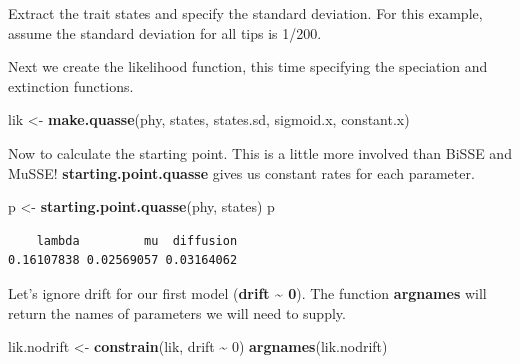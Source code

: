\documentclass[
]{book}
\newenvironment{Shaded}{\begin{snugshade}}{\end{snugshade}}
\newcommand{\DecValTok}[1]{\textcolor[rgb]{0.00,0.00,0.81}{#1}}
\newcommand{\KeywordTok}[1]{\textcolor[rgb]{0.13,0.29,0.53}{\textbf{#1}}}
\newcommand{\NormalTok}[1]{#1}
\newcommand{\OperatorTok}[1]{\textcolor[rgb]{0.81,0.36,0.00}{\textbf{#1}}}
\newcommand{\StringTok}[1]{\textcolor[rgb]{0.31,0.60,0.02}{#1}}
\begin{document}
Extract the trait states and specify the standard deviation. For this example, assume the standard deviation for all tips is 1/200.

\begin{Shaded}
\end{Shaded}

Next we create the likelihood function, this time specifying the speciation and extinction functions.

\begin{Shaded}
\begin{Highlighting}[]
\NormalTok{lik \textless{}{-}}\StringTok{ }\KeywordTok{make.quasse}\NormalTok{(phy, states, states.sd, sigmoid.x, constant.x)}
\end{Highlighting}
\end{Shaded}

Now to calculate the starting point. This is a little more involved than BiSSE and MuSSE! \textbf{starting.point.quasse} gives us constant rates for each parameter.

\begin{Shaded}
\begin{Highlighting}[]
\NormalTok{p \textless{}{-}}\StringTok{ }\KeywordTok{starting.point.quasse}\NormalTok{(phy, states)}
\NormalTok{p}
\end{Highlighting}
\end{Shaded}

\begin{verbatim}
    lambda         mu  diffusion 
0.16107838 0.02569057 0.03164062 
\end{verbatim}

Let's ignore drift for our first model (\textbf{drift \textasciitilde{} 0}). The function \textbf{argnames} will return the names of parameters we will need to supply.

\begin{Shaded}
\begin{Highlighting}[]
\NormalTok{lik.nodrift \textless{}{-}}\StringTok{ }\KeywordTok{constrain}\NormalTok{(lik, drift }\OperatorTok{\textasciitilde{}}\StringTok{ }\DecValTok{0}\NormalTok{)}
\KeywordTok{argnames}\NormalTok{(lik.nodrift)}
\end{Highlighting}
\end{Shaded}
\end{document}
